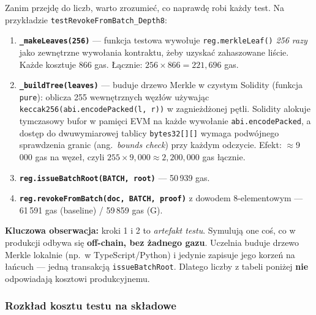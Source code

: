 \documentclass[11pt,a4paper]{article}
\begin{document}
Zanim przejdę do liczb, warto zrozumieć, co naprawdę robi każdy test.
Na przykładzie \texttt{testRevokeFromBatch\_Depth8}:

\begin{enumerate}
  \item \textbf{\texttt{\_makeLeaves(256)}} --- funkcja testowa wywołuje
        \texttt{reg.merkleLeaf()} \emph{256 razy} jako zewnętrzne wywołania kontraktu,
        żeby uzyskać zahaszowane liście. Każde kosztuje 866 gas.
        Łącznie: $256 \times 866 = 221{,}696$ gas.
  \item \textbf{\texttt{\_buildTree(leaves)}} --- buduje drzewo Merkle w czystym
        Solidity (funkcja \texttt{pure}): oblicza 255 wewnętrznych węzłów
        używając \texttt{keccak256(abi.encodePacked(l, r))} w zagnieżdżonej pętli.
        Solidity alokuje tymczasowy bufor w pamięci EVM na każde wywołanie
        \texttt{abi.encodePacked}, a dostęp do dwuwymiarowej tablicy
        \texttt{bytes32[][]} wymaga podwójnego sprawdzenia granic (ang.\ \emph{bounds check})
        przy każdym odczycie. Efekt: $\approx$9\,000 gas na węzeł,
        czyli $255 \times 9{,}000 \approx 2{,}200{,}000$ gas łącznie.
  \item \textbf{\texttt{reg.issueBatchRoot(BATCH, root)}} --- 50\,939 gas.
  \item \textbf{\texttt{reg.revokeFromBatch(doc, BATCH, proof)}} z dowodem
        8-elementowym --- 61\,591 gas (baseline) / 59\,859 gas (G).
\end{enumerate}

\noindent\textbf{Kluczowa obserwacja:} kroki 1 i 2 to \emph{artefakt testu}.
Symulują one coś, co w produkcji odbywa się \textbf{off-chain, bez żadnego gazu}.
Uczelnia buduje drzewo Merkle lokalnie (np.\ w TypeScript/Python) i jedynie
zapisuje jego korzeń na łańcuch --- jedną transakcją \texttt{issueBatchRoot}.
Dlatego liczby z tabeli poniżej \textbf{nie} odpowiadają kosztowi produkcyjnemu.

\subsubsection*{Rozkład kosztu testu na składowe}
\end{document}
